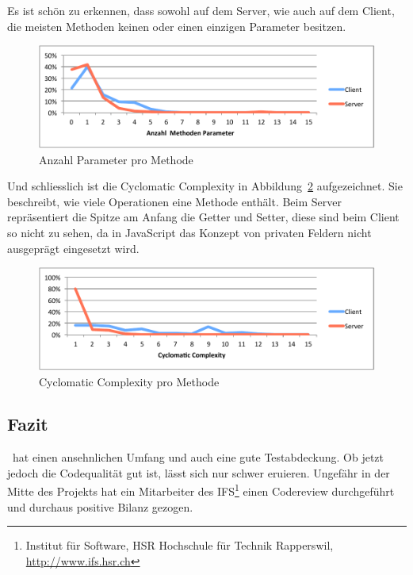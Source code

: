 	Es ist schön zu erkennen, dass sowohl auf dem Server, wie auch auf dem Client,
	die meisten Methoden keinen oder einen einzigen Parameter besitzen.
	\begin{figure}[H]
		\includegraphics[width=\textwidth]{qualityManagement/media/img/methodComplexityParameterCount.pdf}
		\centering
		\caption{Anzahl Parameter pro Methode}
		\label{fig:methodComplexityParameterCount}
	\end{figure}
	Und schliesslich ist die Cyclomatic Complexity in Abbildung\ \ref{fig:methodComplexityCyclomaticComplexity} aufgezeichnet.
	Sie beschreibt, wie viele Operationen eine Methode enthält.
	Beim Server repräsentiert die Spitze am Anfang die Getter und Setter,
	diese sind beim Client so nicht zu sehen,
	da in JavaScript das Konzept von privaten Feldern nicht ausgeprägt eingesetzt wird.
	\begin{figure}[H]
		\includegraphics[width=\textwidth]{qualityManagement/media/img/methodComplexityCyclomaticComplexity.pdf}
		\centering
		\caption{Cyclomatic Complexity pro Methode}
		\label{fig:methodComplexityCyclomaticComplexity}
	\end{figure}
	
	\subsection{Fazit}
		\eeppi\ hat einen ansehnlichen Umfang und auch eine gute Testabdeckung.
		Ob jetzt jedoch die Codequalität gut ist, lässt sich nur schwer eruieren.
		Ungefähr in der Mitte des Projekts hat ein Mitarbeiter des IFS\footnote{Institut für Software, HSR Hochschule für Technik Rapperswil, \url{http://www.ifs.hsr.ch}} einen Codereview durchgeführt und durchaus positive Bilanz gezogen.
		
